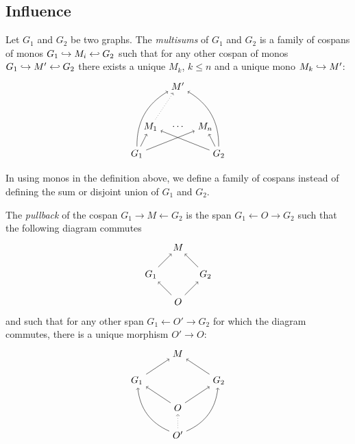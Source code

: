 \subsection{Influence}
\label{sec:infl}

\begin{definition}
  Let $G_1$ and $G_2$ be two graphs. The \emph{multisums} of $G_1$ and $G_2$ is a family of cospans of monos $G_1\hookrightarrow M_i\hookleftarrow G_2$ such that for any other cospan of monos $G_1\hookrightarrow M'\hookleftarrow G_2$ there exists a unique $M_k$, $k\leq n$ and a unique mono $M_k\hookrightarrow M'$:
  \[
  \begin{tikzpicture} %
    \node (l1) at (-1.5,0) {\(G_1\)};
    \node (l2) at (1.5,0) {\(G_2\)};
    \node (m1) at (-1,1) {\(M_1\)};
    \node (m2) at (0,1) {\(\cdots\)};
    \node (mn) at (1,1) {\(M_n\)};
    \node (n) at (0,2.5) {\(M'\)};
    \draw [->] (l1) -- (m1);
    \draw [->] (l2) -- (m1);
    \draw [->] (l1) -- (mn);
    \draw [->] (l2) -- (mn);
    \draw [->] (l1) to [bend left] (n);
    \draw [->] (l2) to [bend right] (n);
    \draw [->, dotted] (m1) -- (n);
  \end{tikzpicture}
  \]
\end{definition}

\begin{remark}
  In using monos in the definition above, we define a family of cospans instead of defining the sum or disjoint union of $G_1$ and $G_2$.
\end{remark}

\begin{definition}[Pullback]
  The \emph{pullback} of the cospan $G_1\rightarrow M\leftarrow G_2$ is the span $G_1\leftarrow O\rightarrow G_2$ such that the following diagram commutes
  \[
  \begin{tikzpicture} %
    \node (o) at (0,-1) {\(O\)};
    \node (l1) at (-1,0) {\(G_1\)};
    \node (l2) at (1,0) {\(G_2\)};
    \node (m) at (0,1) {\(M\)};
    \draw [->] (o) --  (l1);
    \draw [->] (o) --  (l2);
    \draw [->] (l1) --  (m);
    \draw [->] (l2) --  (m);
  \end{tikzpicture}
  \]
  and such that for any other span $G_1\leftarrow O'\rightarrow G_2$ for which the diagram commutes, there is a unique morphism $O'\to O$:
  \[
  \begin{tikzpicture} %
    \node (o) at (0,-1) {\(O\)};
    \node (l1) at (-1.5,0) {\(G_1\)};
    \node (l2) at (1.5,0) {\(G_2\)};
    \node (m) at (0,1) {\(M\)};
    \node (n) at (0,-2) {\(O'\)};
    \draw [->] (o) --  (l1);
    \draw [->] (o) --  (l2);
    \draw [->] (l1) --  (m);
    \draw [->] (l2) --  (m);
    \draw [->] (n) to [bend left] (l1);
    \draw [->] (n) to [bend right] (l2);
    \draw [->, dotted] (n) -- (o);
  \end{tikzpicture}
  \]
\end{definition}


